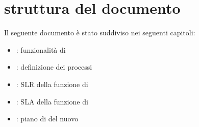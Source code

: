 %
%
\section[Struttura del documento]{struttura del documento}
\label{abs-document-structure}
Il seguente documento è stato suddiviso nei seguenti capitoli:

\begin{itemize}
\item{: funzionalità di }
\item{: definizione dei processi}
\item{: \ac{SLR} della funzione di }
\item{: \ac{SLA} della funzione di }
\item{: piano di  del nuovo }
\end{itemize}